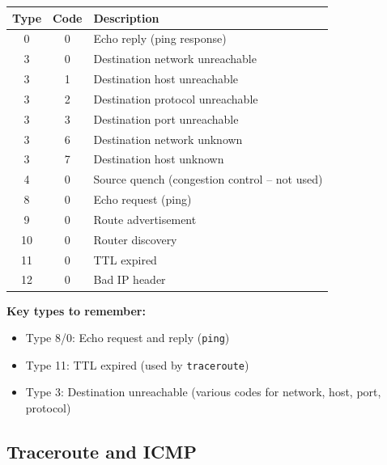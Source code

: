 \begin{exambox}
\begin{center}
\begin{tabular}{ccl}
\toprule
\textbf{Type} & \textbf{Code} & \textbf{Description} \\
\midrule
0 & 0 & Echo reply (ping response) \\
3 & 0 & Destination network unreachable \\
3 & 1 & Destination host unreachable \\
3 & 2 & Destination protocol unreachable \\
3 & 3 & Destination port unreachable \\
3 & 6 & Destination network unknown \\
3 & 7 & Destination host unknown \\
4 & 0 & Source quench (congestion control -- not used) \\
8 & 0 & Echo request (ping) \\
9 & 0 & Route advertisement \\
10 & 0 & Router discovery \\
11 & 0 & TTL expired \\
12 & 0 & Bad IP header \\
\bottomrule
\end{tabular}
\end{center}

\textbf{Key types to remember:}
\begin{itemize}[noitemsep]
    \item Type 8/0: Echo request and reply (\texttt{ping})
    \item Type 11: TTL expired (used by \texttt{traceroute})
    \item Type 3: Destination unreachable (various codes for network, host, port, protocol)
\end{itemize}
\end{exambox}

\begin{imagebox}
\end{imagebox}

\subsection{Traceroute and ICMP}

